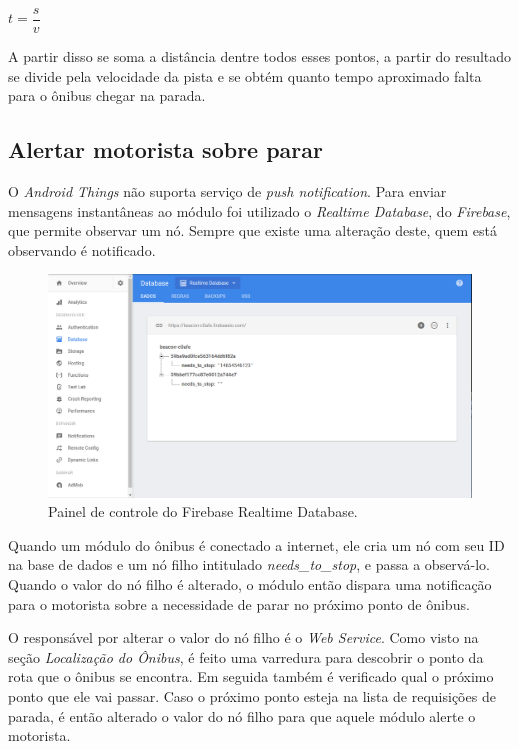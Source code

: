 \documentclass[
	12pt,				%
	oneside,			%
	a4paper,			%
	brazil				%
]{abntex2}
\begin{document}
\begin{center}
$t = \dfrac{s}{v}$ 
\end{center}

A partir disso se soma a distância dentre todos esses pontos, a partir do resultado se divide pela velocidade da pista e se obtém quanto tempo aproximado falta para o ônibus chegar na parada.

\subsection{Alertar motorista sobre parar}

O \textit{Android Things} não suporta serviço de \textit{push notification}. Para enviar mensagens instantâneas ao módulo foi utilizado o \textit{Realtime Database}, do \textit{Firebase}, que permite observar um nó. Sempre que existe uma alteração deste, quem está observando é notificado.

\begin{figure}[H]
\centering
\includegraphics[width=15cm, center]{images/realtime-database}
\caption{Painel de controle do Firebase Realtime Database.}
\label{Rotulo}
\end{figure}

Quando um módulo do ônibus é conectado a internet, ele cria um nó com seu ID na base de dados e um nó filho intitulado \textit{needs\_to\_stop}, e passa a observá-lo. Quando o valor do nó filho é alterado, o módulo então dispara uma notificação para o motorista sobre a necessidade de parar no próximo ponto de ônibus.

O responsável por alterar o valor do nó filho é o \textit{Web Service}. Como visto na seção \textit{Localização do Ônibus}, é feito uma varredura para descobrir o ponto da rota que o ônibus se encontra. Em seguida também é verificado qual o próximo ponto que ele vai passar. Caso o próximo ponto esteja na lista de requisições de parada, é então alterado o valor do nó filho para que aquele módulo alerte o motorista.
\end{document}

